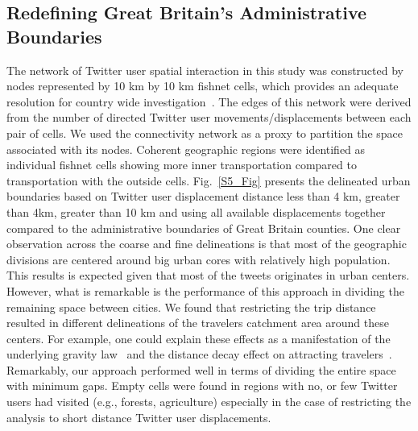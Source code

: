 \documentclass[10pt,letterpaper]{article}
\begin{document}
\subsection*{Redefining Great Britain’s Administrative Boundaries}
The network of Twitter user spatial interaction in this study was constructed by nodes represented by 10 km by 10 km fishnet cells, which provides an adequate resolution for country wide investigation~\cite{ratti2010}.
The edges of this network were derived from the number of directed Twitter user movements/displacements between each pair of cells.
We used the connectivity network as a proxy to partition the space associated with its nodes.
Coherent geographic regions were identified as individual fishnet cells showing more inner transportation compared to transportation with the outside cells.
Fig.~\ref{S5_Fig}  presents the delineated urban boundaries based on Twitter user displacement distance less than 4 km, greater than 4km, greater than 10 km and using all available displacements together compared to the administrative boundaries of Great Britain counties.
One clear observation across the coarse and fine delineations is that most of the geographic divisions are centered around big urban cores with relatively high population.
This results is expected given that most of the tweets originates in urban centers.
However, what is remarkable is the performance of this approach in dividing the remaining space between cities.
We found that restricting the trip distance resulted in different delineations of the travelers catchment area around these centers.
For example, one could explain these effects as a manifestation of the underlying gravity law~\cite{simini2012} and the distance decay effect on attracting travelers~\cite{gonzalez2008}.
Remarkably, our approach performed well in terms of dividing the entire space with minimum gaps.
Empty cells were found in regions with no, or few Twitter users had visited (e.g., forests, agriculture) especially in the case of restricting the analysis to short distance Twitter user displacements.
\end{document}

